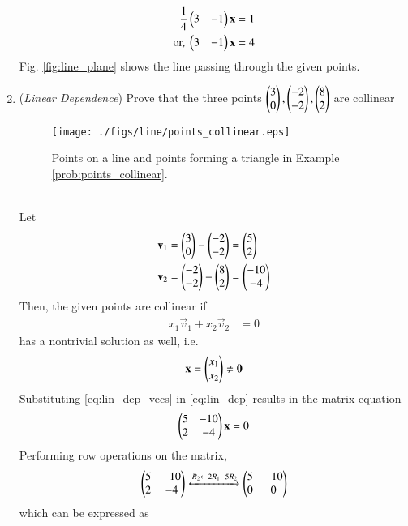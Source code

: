 \begin{enumerate}[label=\thesubsection.\arabic*.,ref=\thesubsection.\theenumi]
\begin{align}
\frac{1}{4}\begin{pmatrix}3 &-1\end{pmatrix}\mathbf{x} &= 1
\\
\text{or, } \begin{pmatrix}3 &-1\end{pmatrix}\mathbf{x} &= 4
\end{align}
Fig. \ref{fig:line_plane} shows the line passing through the given points.
\item  ({\em Linear Dependence}) Prove that the three points $\begin{pmatrix}3\\0\end{pmatrix},\begin{pmatrix}-2\\-2\end{pmatrix},\begin{pmatrix}8\\2\end{pmatrix}$ are collinear 
\label{prob:points_collinear}
\begin{figure}
\centering
\texttt{[image: ./figs/line/points\_collinear.eps]}
\caption{ Points on a line and points forming a triangle in Example \ref{prob:points_collinear}.}%
\label{fig:line_collinear}
\end{figure}
\\
\solution 
Let
\begin{align}
\begin{split}
\mathbf{v}_1 &= \begin{pmatrix}3\\0\end{pmatrix}-\begin{pmatrix}-2\\-2\end{pmatrix} = \begin{pmatrix}5\\2\end{pmatrix}
\\
\mathbf{v}_2 &=\begin{pmatrix}-2\\-2\end{pmatrix}-\begin{pmatrix}8\\2\end{pmatrix} = \begin{pmatrix}-10\\-4\end{pmatrix}
\end{split}
\label{eq:lin_dep_vecs}
\end{align}
Then, the given points are collinear if 
\begin{align}
\label{eq:lin_dep}
x_1\vec{v}_1+x_2\vec{v}_2 &= 0 
\end{align}
has a nontrivial solution as well, i.e.
\begin{align}
\mathbf{x} =\begin{pmatrix}x_1\\x_2\end{pmatrix} \ne \mathbf{0}
\end{align}
Substituting \eqref{eq:lin_dep_vecs}
in \eqref{eq:lin_dep} results in the matrix  equation
\begin{align}
\begin{pmatrix}5 & -10\\ 2 & -4\end{pmatrix}\mathbf{x} = 0
\end{align}
Performing row operations on the matrix,
\begin{align}
\begin{pmatrix}5 & -10\\ 2 & -4\end{pmatrix}
\xleftrightarrow[]{R_2\leftarrow 2R_1-5R_2}
\begin{pmatrix}5 & -10\\ 0 & 0\end{pmatrix}
\end{align}
which can be expressed as

\end{enumerate}
